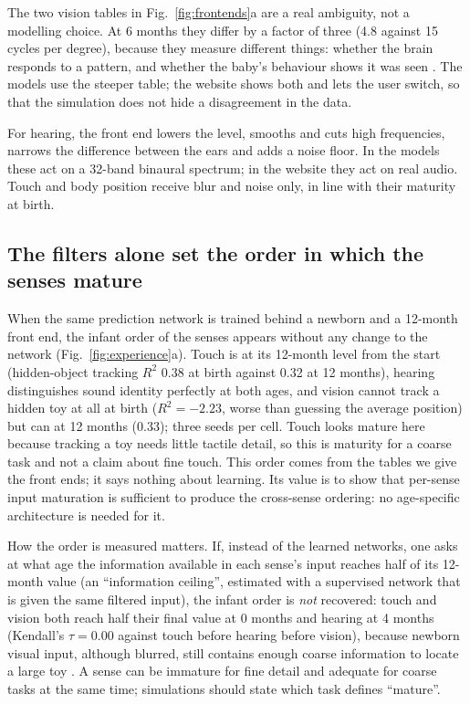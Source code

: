 \documentclass{article}
\begin{document}
The two vision tables in Fig.~\ref{fig:frontends}a are a real ambiguity, not a modelling choice. At 6 months they differ by a factor of three (4.8 against 15 cycles per degree), because they measure different things: whether the brain responds to a pattern, and whether the baby's behaviour shows it was seen \autocite{dobson1978visual}. The models use the steeper table; the website shows both and lets the user switch, so that the simulation does not hide a disagreement in the data.

For hearing, the front end lowers the level, smooths and cuts high frequencies, narrows the difference between the ears and adds a noise floor. In the models these act on a 32-band binaural spectrum; in the website they act on real audio. Touch and body position receive blur and noise only, in line with their maturity at birth.

\subsection{The filters alone set the order in which the senses mature}

When the same prediction network is trained behind a newborn and a 12-month front end, the infant order of the senses appears without any change to the network (Fig.~\ref{fig:experience}a). Touch is at its 12-month level from the start (hidden-object tracking $R^2$ 0.38 at birth against 0.32 at 12 months), hearing distinguishes sound identity perfectly at both ages, and vision cannot track a hidden toy at all at birth ($R^2=-2.23$, worse than guessing the average position) but can at 12 months (0.33); three seeds per cell. Touch looks mature here because tracking a toy needs little tactile detail, so this is maturity for a coarse task and not a claim about fine touch. This order comes from the tables we give the front ends; it says nothing about learning. Its value is to show that per-sense input maturation is sufficient to produce the cross-sense ordering: no age-specific architecture is needed for it.

How the order is measured matters. If, instead of the learned networks, one asks at what age the information available in each sense's input reaches half of its 12-month value (an ``information ceiling'', estimated with a supervised network that is given the same filtered input), the infant order is \emph{not} recovered: touch and vision both reach half their final value at 0 months and hearing at 4 months (Kendall's $\tau = 0.00$ against touch before hearing before vision), because newborn visual input, although blurred, still contains enough coarse information to locate a large toy \autocite{mohapatra2026learn}. A sense can be immature for fine detail and adequate for coarse tasks at the same time; simulations should state which task defines ``mature''.
\end{document}
